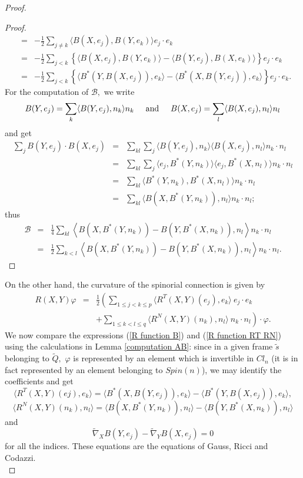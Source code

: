 \documentclass{amsart}
\begin{document}
\begin{proof}
\begin{proof}
\begin{eqnarray*}
&=&-\frac{1}{2}\sum_{j\neq k} \langle B(X,e_j),B(Y,e_k)\rangle e_j\cdot e_k\\
&=&-\frac{1}{2}\sum_{j< k}  \left\{\langle B(X,e_j),B(Y,e_k)\rangle-\langle B(Y,e_j),B(X,e_k)\rangle\right\}e_j\cdot e_k\\
&=&-\frac{1}{2}\sum_{j< k}\left\{\langle B^*(Y,B(X,e_j)),e_k\rangle- \langle B^*(X,B(Y,e_j)),e_k\rangle\right\}e_j\cdot e_k.
\end{eqnarray*}
For the computation of $\mathcal{B},$ we write
$$B(Y,e_j)=\sum_k\langle B(Y,e_j),n_k\rangle n_k\hspace{.5cm}\mbox{and}\hspace{.5cm}B(X,e_j)=\sum_l\langle B(X,e_j),n_l\rangle n_l$$
and get
\begin{eqnarray*}
\sum_j B(Y,e_j)\cdot B(X,e_j)&=&\sum_{kl}\sum_j\langle B(Y,e_j),n_k\rangle\langle B(X,e_j),n_l\rangle n_k\cdot n_l\\
&=&\sum_{kl}\sum_j\langle e_j,B^*(Y,n_k)\rangle\langle e_j,B^*(X,n_l)\rangle n_k\cdot n_l\\
&=&\sum_{kl}\langle B^*(Y,n_k),B^*(X,n_l)\rangle n_k\cdot n_l\\
&=&\sum_{kl}\langle B(X,B^*(Y,n_k)),n_l\rangle n_k\cdot n_l;
\end{eqnarray*}
thus
\begin{eqnarray*}
\mathcal{B}&=&\frac{1}{4}\sum_{kl}\left\langle B(X,B^*(Y,n_k))-B(Y,B^*(X,n_k)),n_l\right\rangle n_k\cdot n_l\\
&=&\frac{1}{2}\sum_{k<l}\left\langle B(X,B^*(Y,n_k))-B(Y,B^*(X,n_k)),n_l\right\rangle n_k\cdot n_l.
\end{eqnarray*}
\end{proof}
On the other hand, the curvature of the spinorial connection is given by
\begin{eqnarray}
R(X,Y)\varphi&=&\frac{1}{2}\left(\sum_{1\leq j<k\leq p}\langle R^T(X,Y)(e_j),e_k\rangle\ e_j\cdot e_k\right.\label{R function RT RN}\\
&&+\left.\sum_{1\leq k<l\leq q}\langle R^N(X,Y)(n_k),n_l\rangle\ n_k\cdot n_l\right)\cdot\varphi.\nonumber
\end{eqnarray}
We now compare the expressions (\ref{R function B}) and (\ref{R function RT RN}) using the calculations in Lemma \ref{computation AB}: since in a given frame $\tilde{s}$ belonging to $\tilde{Q},$ $\varphi$ is represented by an element which is invertible in $Cl_n$ (it is in fact represented by an element belonging to $Spin(n)$), we may identify the coefficients and get
$$\langle R^T(X,Y)(ej),e_k\rangle =\langle B^*(X,B(Y,e_j)),e_k\rangle- \langle B^*(Y,B(X,e_j)),e_k\rangle,$$
$$\langle R^N(X,Y)(n_k),n_l\rangle=\langle B(X,B^*(Y,n_k)),n_l\rangle-\langle B(Y,B^*(X,n_k)),n_l\rangle$$
and
$$\tilde{\nabla}_X B(Y,e_j)-\tilde{\nabla}_Y B(X,e_j)=0$$
for all the indices. These equations are the equations of Gauss, Ricci and Codazzi.
\\


\end{proof}
\end{document}
